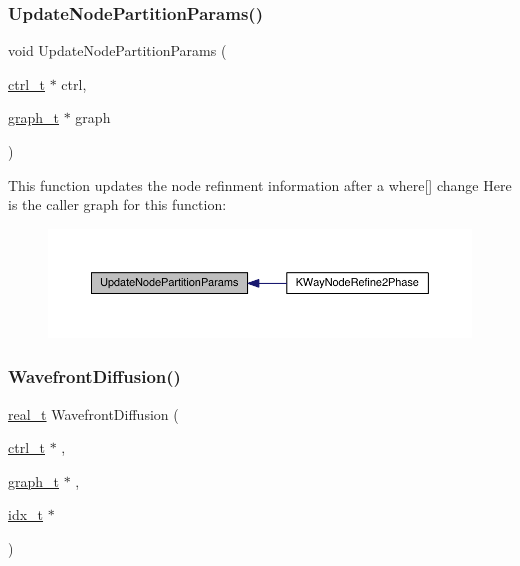 \subsubsection{\texorpdfstring{Update\+Node\+Partition\+Params()}{UpdateNodePartitionParams()}}
{\footnotesize\ttfamily void Update\+Node\+Partition\+Params (\begin{DoxyParamCaption}\item[{\hyperlink{a00742}{ctrl\+\_\+t} $\ast$}]{ctrl,  }\item[{\hyperlink{a00734}{graph\+\_\+t} $\ast$}]{graph }\end{DoxyParamCaption})}

This function updates the node refinment information after a where\mbox{[}\mbox{]} change Here is the caller graph for this function\+:\nopagebreak
\begin{figure}[H]
\begin{center}
\leavevmode
\includegraphics[width=350pt]{a00951_a7a5d889e87411c9e1d2093073fed1c81_icgraph}
\end{center}
\end{figure}
\mbox{\label{a00951_a329e16e0cbd86f11856a1c8f24badaca}} 
\subsubsection{\texorpdfstring{Wavefront\+Diffusion()}{WavefrontDiffusion()}}
{\footnotesize\ttfamily \hyperlink{a00876_a1924a4f6907cc3833213aba1f07fcbe9}{real\+\_\+t} Wavefront\+Diffusion (\begin{DoxyParamCaption}\item[{\hyperlink{a00742}{ctrl\+\_\+t} $\ast$}]{,  }\item[{\hyperlink{a00734}{graph\+\_\+t} $\ast$}]{,  }\item[{\hyperlink{a00876_aaa5262be3e700770163401acb0150f52}{idx\+\_\+t} $\ast$}]{ }\end{DoxyParamCaption})}

